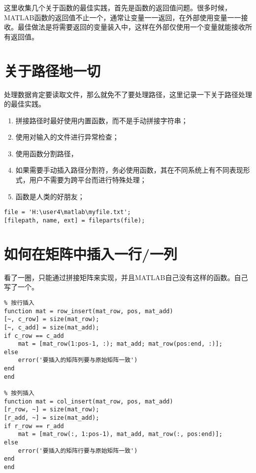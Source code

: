 这里收集几个关于函数的最佳实践，首先是函数的返回值问题。很多时候，MATLAB函数的返回值不止一个，通常让变量一一返回，在外部使用变量一一接收。最佳做法是将需要返回的变量装入中，这样在外部仅使用一个变量就能接收所有返回值。

\section{关于路径地一切}

处理数据肯定要读取文件，那么就免不了要处理路径，这里记录一下关于路径处理的最佳实践。

\begin{enumerate}
    \item 拼接路径时最好使用内置函数，而不是手动拼接字符串；
    \item 使用对输入的文件进行异常检查；
    \item 使用函数分割路径，
    \item 如果需要手动插入路径分割符，务必使用函数，其在不同系统上有不同表现形式，用户不需要为跨平台而进行特殊处理；
    \item {}函数是人类的好朋友；
\end{enumerate}

\begin{verbatim}
file = 'H:\user4\matlab\myfile.txt';
[filepath, name, ext] = fileparts(file);
\end{verbatim}

\section{如何在矩阵中插入一行/一列}

看了一圈，只能通过拼接矩阵来实现，并且MATLAB自己没有这样的函数。自己写了一个。

\begin{verbatim}
% 按行插入
function mat = row_insert(mat_row, pos, mat_add)
[~, c_row] = size(mat_row);
[~, c_add] = size(mat_add);
if c_row == c_add
    mat = [mat_row(1:pos-1, :); mat_add; mat_row(pos:end, :)];
else
    error('要插入的矩阵列要与原始矩阵一致')
end
end

% 按列插入
function mat = col_insert(mat_row, pos, mat_add)
[r_row, ~] = size(mat_row);
[r_add, ~] = size(mat_add);
if r_row == r_add
    mat = [mat_row(:, 1:pos-1), mat_add, mat_row(:, pos:end)];
else
    error('要插入的矩阵行要与原始矩阵一致')
end
end
\end{verbatim}

